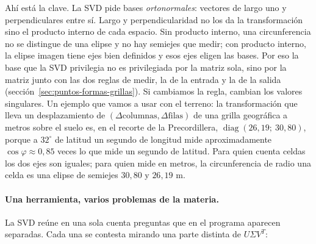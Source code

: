 Ahí está la clave. La SVD pide bases \emph{ortonormales}: vectores de largo uno y
perpendiculares entre sí. Largo y perpendicularidad no los da la transformación sino el
producto interno de cada espacio. Sin producto interno, una circunferencia no se distingue
de una elipse y no hay semiejes que medir; con producto interno, la elipse imagen tiene ejes
bien definidos y esos ejes eligen las bases. Por eso la base que la SVD privilegia no es
privilegiada por la matriz sola, sino por la matriz junto con las dos reglas de medir, la de
la entrada y la de la salida (sección~\ref{sec:puntos-formas-grillas}). Si cambiamos la
regla, cambian los valores singulares. Un ejemplo que vamos a usar con el terreno: la
transformación que lleva un desplazamiento de \((\Delta\text{columnas},\Delta\text{filas})\)
de una grilla geográfica a metros sobre el suelo es, en el recorte de la Precordillera,
\(\operatorname{diag}(26{,}19;\ 30{,}80)\), porque a \(32^\circ\) de latitud un segundo de longitud mide
aproximadamente \(\cos\varphi\approx0{,}85\) veces lo que mide un segundo de latitud. Para quien cuenta
celdas los dos ejes son iguales; para quien mide en metros, la circunferencia de radio una
celda es una elipse de semiejes \(30{,}80\) y \(26{,}19\) m.

\paragraph{Una herramienta, varios problemas de la materia.} La SVD reúne en una sola
cuenta preguntas que en el programa aparecen separadas. Cada una se contesta mirando una
parte distinta de \(U\Sigma V^T\):

